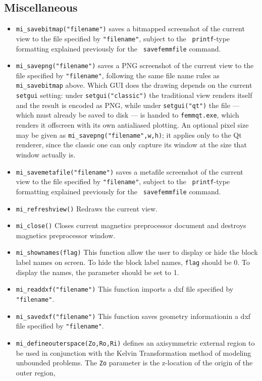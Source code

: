 \subsection{Miscellaneous}
\begin{itemize}
\item{\tt mi\_savebitmap("filename")} saves a bitmapped screenshot of the current
view to the file specified by {\tt "filename"}, subject to the {\tt
printf}-type formatting explained previously for the {\tt
savefemmfile} command.
\item{\tt mi\_savepng("filename")} saves a PNG screenshot of the current
view to the file specified by {\tt "filename"}, following the same file
name rules as {\tt mi\_savebitmap} above. Which GUI does the drawing
depends on the current {\tt setgui} setting: under {\tt setgui("classic")}
the traditional view renders itself and the result is encoded as PNG,
while under {\tt setgui("qt")} the file --- which must already be saved to
disk --- is handed to {\tt femmqt.exe}, which renders it offscreen with its
own antialiased plotting. An optional pixel size may be given as
{\tt mi\_savepng("filename",w,h)}; it applies only to the Qt renderer,
since the classic one can only capture its window at the size that window
actually is.
\item{\tt mi\_savemetafile("filename")} saves a metafile screenshot of the current
view to the file specified by {\tt "filename"}, subject to the {\tt
printf}-type formatting explained previously for the {\tt
savefemmfile} command.
\item{\tt mi\_refreshview()} Redraws the current view.
\item{\tt mi\_close()} Closes current magnetics preprocessor
document and destroys magnetics preprocessor window.
\item{\tt mi\_shownames(flag)} This function allow the user to display or hide the block label
names on screen.  To hide the block label names, {\tt flag} should be 0.  To display the
names, the parameter should be set to 1.
\item{\tt mi\_readdxf("filename")} This function imports a dxf file specified by {\tt "filename"}.
\item{\tt mi\_savedxf("filename")} This function saves geometry informationin a dxf file specified by {\tt "filename"}.
\item{\tt mi\_defineouterspace(Zo,Ro,Ri)} defines
an axisymmetric external region to be used in conjunction with the
Kelvin Transformation method of modeling unbounded problems.  The
{\tt Zo} parameter is the z-location of the origin of the outer region,

\end{itemize}

